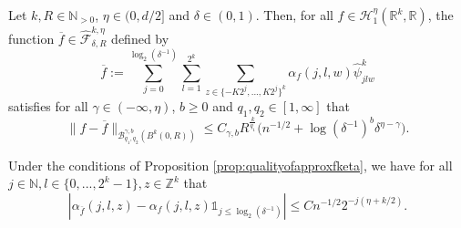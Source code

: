 \documentclass[10pt,a4paper]{amsart}
\begin{document}
\begin{proposition}\label{prop:qualityofapproxfketa} Let $k,R\in \mathbb{N}_{>0}$, $\eta\in (0,d/2]$ and $\delta\in(0,1)$. Then,
    for all $f\in \mathcal{H}^{\eta}_1(\mathbb{R}^k,\mathbb{R})$, the function $\overline{f}\in \hat{\mathcal{F}}_{\delta,R}^{k,\eta}$ defined by
    $$\overline{f}:=\sum \limits_{j=0}^{\log_2(\delta^{-1})} \sum \limits_{l=1}^{2^k} \sum \limits_{z\in \{-K2^j,...,K2^j\}^k} \alpha_f(j,l,w) \hat{\psi}^k_{jlw}$$
    satisfies for all $\gamma \in (-\infty,\eta)$, $b \geq 0$ and $q_1,q_2\in [1,\infty]$ that 
    $$  \|f-\overline{f}\|_{\mathcal{B}^{\gamma,b}_{q_1,q_2}(B^k(0,R))}\leq C_{\gamma,b}R^{\frac{k}{q_1}} \big(n^{-1/2}+\log(\delta^{-1})^b\delta^{\eta-\gamma}\big).$$
\end{proposition}

\begin{lemma}\label{lemma:bouundcoefwav}
    Under the conditions of Proposition \ref{prop:qualityofapproxfketa}, we have for all
    $j\in \mathbb{N},l\in \{0,...,2^k-1\},z\in \mathbb{Z}^k$ that 
$$
|\alpha_{\overline{f}}(j,l,z)-\alpha_{f}(j,l,z)\mathds{1}_{j\leq \log_2(\delta^{-1})}|\leq Cn^{-1/2}2^{-j(\eta+k/2)}.
$$

\end{lemma}
\end{document}
